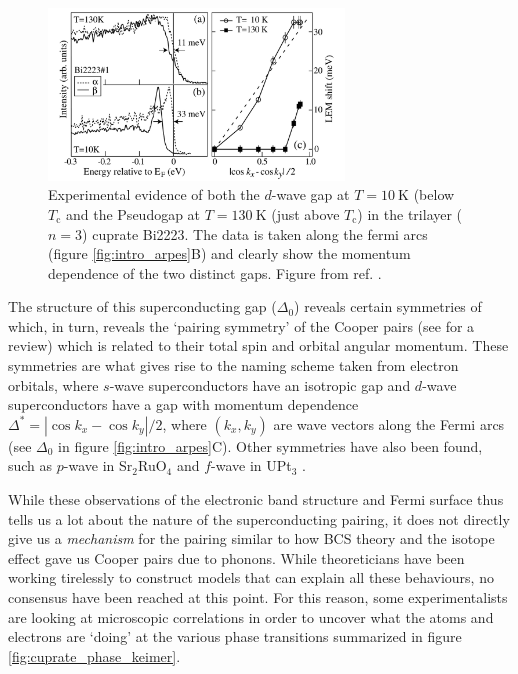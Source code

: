 \begin{figure}[]
    \centering
    \includegraphics[width=0.7\textwidth]{fig/intro/arpes_feng.png}
    \caption[ARPES gaps data]{Experimental evidence of both the $d$-wave gap at $T=\SI{10}{\kelvin}$ (below $T_\text{c}$ and the Pseudogap at $T=\SI{130}{\kelvin}$ (just above $T_\text{c}$) in the trilayer ($n=3$) cuprate Bi2223. The data is taken along the fermi arcs (figure \ref{fig:intro_arpes}B) and clearly show the momentum dependence of the two distinct gaps. Figure from ref. \cite{Feng2002}.}
    \label{fig:intro_arpes_feng}
\end{figure}

The structure of this superconducting gap ($\Delta_0$) reveals certain symmetries of which, in turn, reveals the `pairing symmetry' of the Cooper pairs (see \cite{Tsuei2000} for a review) which is related to their total spin and orbital angular momentum. These symmetries are what gives rise to the naming scheme taken from electron orbitals, where $s$-wave superconductors have an isotropic gap and $d$-wave superconductors have a gap with momentum dependence $\Delta^* = | \cos k_x - \cos k_y | / 2$, where $(k_x, k_y)$ are wave vectors along the Fermi arcs (see $\Delta_0$ in figure \ref{fig:intro_arpes}C). Other symmetries have also been found, such as $p$-wave in Sr$_2$RuO$_4$ \cite{Mackenzie2003} and $f$-wave in UPt$_3$ \cite{Joynt2002}.

While these observations of the electronic band structure and Fermi surface thus tells us a lot about the nature of the superconducting pairing, it does not directly give us a \emph{mechanism} for the pairing similar to how BCS theory and the isotope effect gave us Cooper pairs due to phonons. While theoreticians have been working tirelessly to construct models that can explain all these behaviours, no consensus have been reached at this point. For this reason, some experimentalists are looking at microscopic correlations in order to uncover what the atoms and electrons are `doing' at the various phase transitions summarized in figure \ref{fig:cuprate_phase_keimer}.

